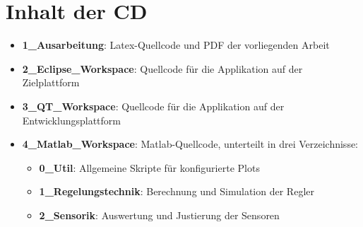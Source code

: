 \chapter*{Inhalt der CD}
\begin{itemize}
\item \textbf{1\_Ausarbeitung}: Latex-Quellcode und PDF der vorliegenden Arbeit
\item \textbf{2\_Eclipse\_Workspace}: Quellcode für die Applikation auf der Zielplattform
\item \textbf{3\_QT\_Workspace}: Quellcode für die Applikation auf der Entwicklungsplattform
\item \textbf{4\_Matlab\_Workspace}: Matlab-Quellcode, unterteilt in drei Verzeichnisse:
 \begin{itemize}
 	\item \textbf{0\_Util}: Allgemeine Skripte für konfigurierte Plots
 	\item \textbf{1\_Regelungstechnik}: Berechnung und Simulation der Regler
 	\item \textbf{2\_Sensorik}: Auswertung und Justierung der Sensoren
 \end{itemize}
\end{itemize}